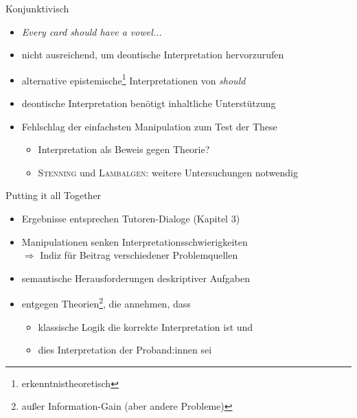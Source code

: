 \begin{frame}{Konjunktivisch {\scriptsize \cite[S.~110]{stenningHumanReasoningCognitive2008}}}
    \begin{itemize}
        \item \emph{Every card \alert{should} have a vowel...}
        \item nicht ausreichend, um deontische Interpretation hervorzurufen
        \item alternative epistemische\footnote[frame]{\scriptsize erkenntnistheoretisch} Interpretationen von \emph{should}
        \item deontische Interpretation benötigt inhaltliche Unterstützung
        
        \item Fehlschlag der einfachsten Manipulation zum Test der These
        \begin{itemize}
            \item Interpretation als Beweis gegen Theorie?
            \item \textsc{Stenning} und \textsc{Lambalgen}: weitere Untersuchungen notwendig
        \end{itemize}
    \end{itemize}
\end{frame}


\begin{frame}{Putting it all Together {\scriptsize \cite[S.~110-112]{stenningHumanReasoningCognitive2008}}}
    \begin{itemize}
        \item Ergebnisse entsprechen Tutoren-Dialoge (Kapitel 3)
        \item Manipulationen senken Interpretationsschwierigkeiten \\
            $\Rightarrow$ Indiz für Beitrag verschiedener Problemquellen
        \item semantische Herausforderungen deskriptiver Aufgaben
        
        \item entgegen Theorien\footnote[frame]{\scriptsize außer Information-Gain (aber andere Probleme)}, die annehmen, dass
        \begin{itemize}
            \item klassische Logik die korrekte Interpretation ist und
            \item dies Interpretation der Proband:innen sei
        \end{itemize}
    \end{itemize}
\end{frame}
